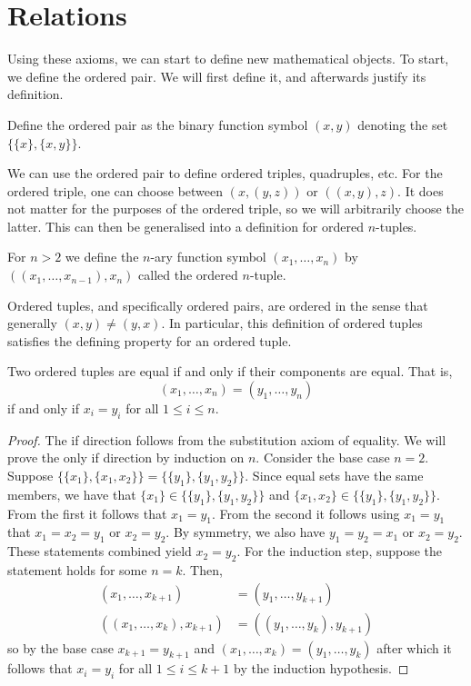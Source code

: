 \documentclass[../main.tex]{subfiles}
\begin{document}
\section{Relations}\label{sec:zermelo_fraenkel_set_theory:relations}
Using these axioms, we can start to define new mathematical objects. To start, we define the ordered pair. We will first define it, and afterwards justify its definition.
\begin{definition}\label{dfn:zermelo_fraenkel_set_theory:ordered_pair}
    Define the ordered pair as the binary function symbol $(x,y)$ denoting the set $\{\{x\},\{x,y\}\}$.
\end{definition}
We can use the ordered pair to define ordered triples, quadruples, etc. For the ordered triple, one can choose between $(x,(y,z))$ or $((x,y),z)$. It does not matter for the purposes of the ordered triple, so we will arbitrarily choose the latter. This can then be generalised into a definition for ordered $n$-tuples.
\begin{definition}
    For $n>2$ we define the $n$-ary function symbol $(x_1,\dots,x_n)$ by $((x_1,\dots,x_{n-1}),x_n)$ called the ordered $n$-tuple.
\end{definition}
Ordered tuples, and specifically ordered pairs, are ordered in the sense that generally $(x,y)\neq(y,x)$. In particular, this definition of ordered tuples satisfies the defining property for an ordered tuple.
\begin{proposition}
    Two ordered tuples are equal if and only if their components are equal. That is,
    \begin{equation*}
        (x_1,\dots,x_n)=(y_1,\dots,y_n)
    \end{equation*}
    if and only if $x_i=y_i$ for all $1\leq i\leq n$.
\end{proposition}
\begin{proof}
     The if direction follows from the substitution axiom of equality. We will prove the only if direction by induction on $n$. Consider the base case $n=2$. Suppose $\{\{x_1\},\{x_1,x_2\}\}=\{\{y_1\},\{y_1,y_2\}\}$. Since equal sets have the same members, we have that $\{x_1\}\in\{\{y_1\},\{y_1,y_2\}\}$ and $\{x_1,x_2\}\in\{\{y_1\},\{y_1,y_2\}\}$. From the first it follows that $x_1=y_1$. From the second it follows using $x_1=y_1$ that $x_1=x_2=y_1$ or $x_2=y_2$. By symmetry, we also have $y_1=y_2=x_1$ or $x_2=y_2$. These statements combined yield $x_2=y_2$. For the induction step, suppose the statement holds for some $n=k$. Then,
     \begin{align*}
         (x_1,\dots,x_{k+1}) & =(y_1,\dots,y_{k+1}) \\
         ((x_1,\dots,x_k),x_{k+1}) & =((y_1,\dots,y_k),y_{k+1})
     \end{align*}
     so by the base case $x_{k+1}=y_{k+1}$ and $(x_1,\dots,x_k)=(y_1,\dots,y_k)$ after which it follows that $x_i=y_i$ for all $1\leq i\leq k+1$ by the induction hypothesis.
\end{proof}
\end{document}
